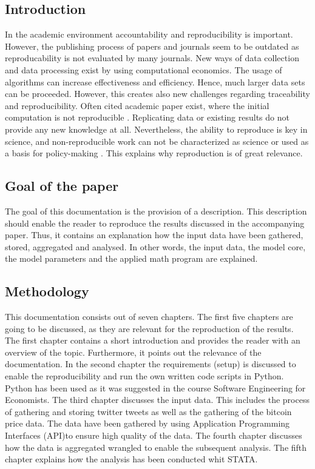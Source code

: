 \documentclass[a4paper,12pt]{article}
\begin{document}
\clearpage

\begin{spacing}{1.2}
\cleardoublepage{}

\section{Introduction}
In the academic environment accountability and reproducibility is important. However, the publishing process of papers and journals seem to be outdated as reproducability is not evaluated by many journals. \parencite[p.~888]{mccullough2003} New ways of data collection and data processing exist by using computational economics. The usage of algorithms can increase effectiveness and efficiency. Hence, much larger data sets can be proceeded. However, this creates also new challenges regarding traceability and reproducibility. Often cited academic paper exist, where the initial computation is not reproducible \parencite[pp.~874--887]{mccullough2003}. Replicating data or existing results do not provide any new knowledge at all. Nevertheless, the ability to reproduce is key in science, and non-reproducible work can not be characterized as science or used as a basis for policy-making \parencite[p.~888]{mccullough2003}. This explains why reproduction is of great relevance.

\subsection{Goal of the paper}
The goal of this documentation is the provision of a description. This description should enable the reader to reproduce the results discussed in the accompanying paper. Thus, it contains an explanation how the input data have been gathered, stored, aggregated and analysed. In other words, the input data, the model core, the model parameters and the applied math program are explained.

\subsection{Methodology}
This documentation consists out of seven chapters. The first five chapters are going to be discussed, as they are relevant for the reproduction of the results. The first chapter contains a short introduction and provides the reader with an overview of the topic. Furthermore, it points out the relevance of the documentation. In the second chapter the requirements (setup) is discussed to enable the reproducibility and run the own written code scripts in Python. Python has been used as it was suggested in the course Software Engineering for Economists. The third chapter discusses the input data. This includes the process of gathering and storing twitter tweets as well as the gathering of the bitcoin price data. The data have been gathered by using Application Programming Interfaces (API)to ensure high quality of the data. The fourth chapter discusses how the data is aggregated wrangled to enable the subsequent analysis. The fifth chapter explains how the analysis has been conducted whit STATA.


\end{spacing}
\end{document}
